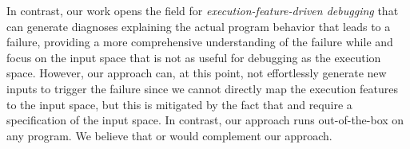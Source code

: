 In contrast, our work opens the field for \emph{execution-feature-driven debugging} that can generate diagnoses explaining the actual program behavior that leads to a failure, providing a more comprehensive understanding of the failure while \ALHAZEN{} and \AVICENNA{} focus on the input space that is not as useful for debugging as the execution space.
However, our approach can, at this point, not effortlessly generate new inputs to trigger the failure since we cannot directly map the execution features to the input space, but this is mitigated by the fact that \ALHAZEN{} and \AVICENNA{} require a specification of the input space. In contrast, our approach runs out-of-the-box on any program.
We believe that \ALHAZEN{} or \AVICENNA{} would complement our approach.
